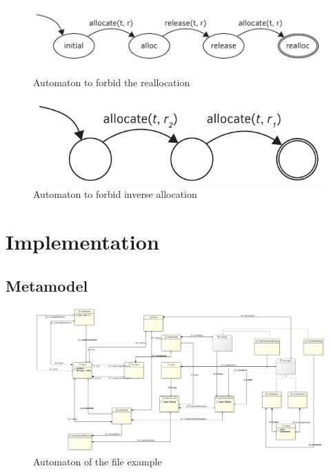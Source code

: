 				\begin{figure}[h]
				\centering
				\includegraphics[width=0.7\linewidth]{include/figures/chapter_5/mars_example_aut1}
				\caption{Automaton to forbid the reallocation}
				\label{fig:cep:marsautomaton1}
				\end{figure}		
				
				
				\begin{figure}[h]
				\centering
				\includegraphics[width=0.7\linewidth]{include/figures/chapter_5/mars_example_aut2}
				\caption{Automaton to forbid inverse allocation}
				\label{fig:cep:marsautomaton2}
				\end{figure}	

				
				
	\section{Implementation}
		\subsection{Metamodel}
		
			\begin{figure}[h]
			\centering
			\includegraphics[width=0.9\linewidth]{include/figures/chapter_5/model}
			\caption{Automaton of the file example}
			\label{fig:cep:model}
			\end{figure}
		
